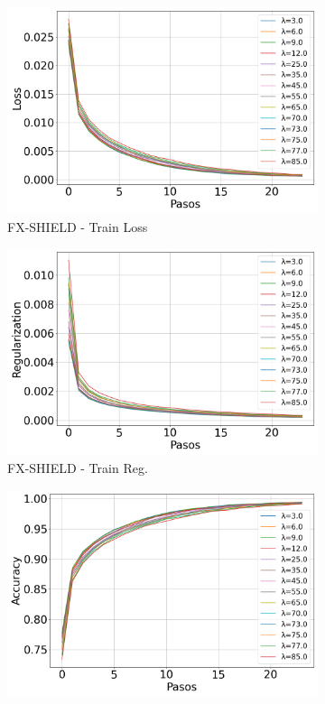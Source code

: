 \begin{figure}[H]
    \centering
    \begin{subfigure}[b]{0.3\textwidth}
        \includegraphics[width=\linewidth]{images/Train_Loss_evolucion_fxshield.png}
        \caption{FX-SHIELD - Train Loss}
    \end{subfigure}
    \hfill
    \begin{subfigure}[b]{0.3\textwidth}
        \includegraphics[width=\linewidth]{images/Train_Regularization_evolucion_fxshield.png}
        \caption{FX-SHIELD - Train Reg.}
    \end{subfigure}
    \hfill
    \begin{subfigure}[b]{0.3\textwidth}
        \includegraphics[width=\linewidth]{images/Train_Accuracy_evolucion_fxshield.png}

\end{subfigure}
\end{figure}
